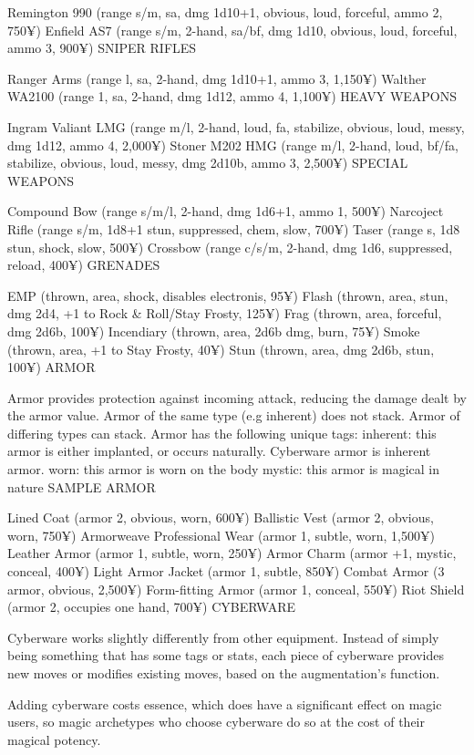 Remington 990 (range s/m, sa, dmg 1d10+1, obvious, loud, forceful, ammo 2, 750¥)
Enfield AS7 (range s/m, 2-hand, sa/bf, dmg 1d10, obvious, loud, forceful, ammo 3, 900¥)
SNIPER RIFLES

Ranger Arms (range l, sa, 2-hand, dmg 1d10+1, ammo 3, 1,150¥)
Walther WA2100 (range 1, sa, 2-hand, dmg 1d12, ammo 4, 1,100¥)
HEAVY WEAPONS

Ingram Valiant LMG (range m/l, 2-hand, loud, fa, stabilize, obvious, loud, messy, dmg 1d12, ammo 4, 2,000¥)
Stoner M202 HMG (range m/l, 2-hand, loud, bf/fa, stabilize, obvious, loud, messy, dmg 2d10b, ammo 3, 2,500¥)
SPECIAL WEAPONS

Compound Bow (range s/m/l, 2-hand, dmg 1d6+1, ammo 1, 500¥)
Narcoject Rifle (range s/m, 1d8+1 stun, suppressed, chem, slow, 700¥)
Taser (range s, 1d8 stun, shock, slow, 500¥)
Crossbow (range c/s/m, 2-hand, dmg 1d6, suppressed, reload, 400¥)
GRENADES

EMP (thrown, area, shock, disables electronis, 95¥)
Flash (thrown, area, stun, dmg 2d4, +1 to Rock \& Roll/Stay Frosty, 125¥)
Frag (thrown, area, forceful, dmg 2d6b, 100¥)
Incendiary (thrown, area, 2d6b dmg, burn, 75¥)
Smoke (thrown, area, +1 to Stay Frosty, 40¥)
Stun (thrown, area, dmg 2d6b, stun, 100¥)
ARMOR

Armor provides protection against incoming attack, reducing the damage dealt by the armor value. Armor of the same type (e.g inherent) does not stack. Armor of differing types can stack. Armor has the following unique tags:
inherent: this armor is either implanted, or occurs naturally. Cyberware armor is inherent armor.
worn: this armor is worn on the body
mystic: this armor is magical in nature
SAMPLE ARMOR

Lined Coat (armor 2, obvious, worn, 600¥)
Ballistic Vest (armor 2, obvious, worn, 750¥)
Armorweave Professional Wear (armor 1, subtle, worn, 1,500¥)
Leather Armor (armor 1, subtle, worn, 250¥)
Armor Charm (armor +1, mystic, conceal, 400¥)
Light Armor Jacket (armor 1, subtle, 850¥)
Combat Armor (3 armor, obvious, 2,500¥)
Form-fitting Armor (armor 1, conceal, 550¥)
Riot Shield (armor 2, occupies one hand, 700¥)
CYBERWARE

Cyberware works slightly differently from other equipment. Instead of simply being something that has some tags or stats, each piece of cyberware provides new moves or modifies existing moves, based on the augmentation’s function.

Adding cyberware costs essence, which does have a significant effect on magic users, so magic archetypes who choose cyberware do so at the cost of their magical potency.

